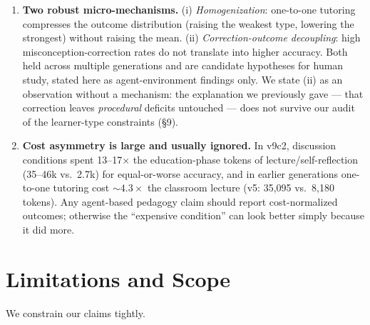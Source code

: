 \documentclass[11pt]{article}
\begin{document}
\begin{enumerate}
  \item \textbf{Two robust micro-mechanisms.}  (i) \emph{Homogenization}: one-to-one
    tutoring compresses the outcome distribution (raising the weakest type, lowering
    the strongest) without raising the mean.  (ii) \emph{Correction-outcome
    decoupling}: high misconception-correction rates do not translate into higher
    accuracy.  Both held across multiple generations and are candidate hypotheses for
    human study, stated here as agent-environment findings only.  We state (ii) as an
    observation without a mechanism: the explanation we previously gave --- that
    correction leaves \emph{procedural} deficits untouched --- does not survive our
    audit of the learner-type constraints (\S9).

  \item \textbf{Cost asymmetry is large and usually ignored.}  In v9c2, discussion
    conditions spent 13--17$\times$ the education-phase tokens of
    lecture/self-reflection (35--46k vs.\ 2.7k) for equal-or-worse accuracy, and in
    earlier generations one-to-one tutoring cost ${\sim}4.3\times$ the classroom
    lecture (v5: 35,095 vs.\ 8,180 tokens).  Any agent-based pedagogy claim should report
    cost-normalized outcomes; otherwise the ``expensive condition'' can look better
    simply because it did more.
\end{enumerate}

\section{Limitations and Scope}

We constrain our claims tightly.
\end{document}
